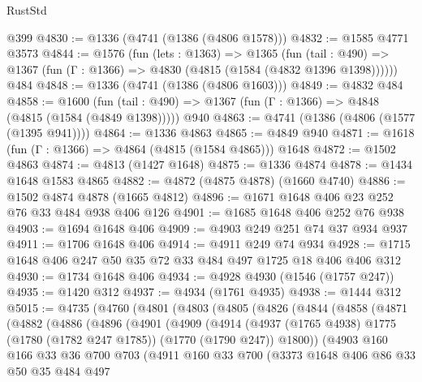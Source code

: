 \begin{lexlean}{RustStd}
\begin{coremodule}
    @399
@4830 := @1336 (@4741 (@1386 (@4806 @1578)))
@4832 := @1585 @4771 @3573
@4844 := @1576
    (fun (lets : @1363) =>
    @1365
      (fun (tail : @490) => @1367 (fun (Γ : @1366) => @4830 (@4815 (@1584 (@4832 @1396 @1398))))))
    @484
@4848 := @1336 (@4741 (@1386 (@4806 @1603)))
@4849 := @4832 @484
@4858 := @1600
    (fun (tail : @490) => @1367 (fun (Γ : @1366) => @4848 (@4815 (@1584 (@4849 @1398)))))
    @940
@4863 := @4741 (@1386 (@4806 (@1577 (@1395 @941))))
@4864 := @1336 @4863
@4865 := @4849 @940
@4871 := @1618 (fun (Γ : @1366) => @4864 (@4815 (@1584 @4865))) @1648
@4872 := @1502 @4863
@4874 := @4813 (@1427 @1648)
@4875 := @1336 @4874
@4878 := @1434 @1648 @1583 @4865
@4882 := @4872 (@4875 @4878) (@1660 @4740)
@4886 := @1502 @4874 @4878 (@1665 @4812)
@4896 := @1671 @1648 @406 @23 @252 @76 @33 @484 @938 @406 @126
@4901 := @1685 @1648 @406 @252 @76 @938
@4903 := @1694 @1648 @406
@4909 := @4903 @249 @251 @74 @37 @934 @937
@4911 := @1706 @1648 @406
@4914 := @4911 @249 @74 @934
@4928 := @1715 @1648 @406 @247 @50 @35 @72 @33 @484 @497 @1725 @18 @406 @406 @312
@4930 := @1734 @1648 @406
@4934 := @4928 @4930 (@1546 (@1757 @247))
@4935 := @1420 @312
@4937 := @4934 (@1761 @4935)
@4938 := @1444 @312
@5015 := @4735
    (@4760
      (@4801
        (@4803
          (@4805
            (@4826
              (@4844
                (@4858
                  (@4871
                    (@4882
                      (@4886
                        (@4896
                          (@4901
                            (@4909
                              (@4914
                                (@4937
                                  (@1765 @4938)
                                  @1775
                                  (@1780 (@1782 @247 @1785))
                                  (@1770 (@1790 @247))
                                  @1800))
                              (@4903
                                @160
                                @166
                                @33
                                @36
                                @700
                                @703
                                (@4911
                                  @160
                                  @33
                                  @700
                                  (@3373
                                    @1648
                                    @406
                                    @86
                                    @33
                                    @50
                                    @35
                                    @484
                                    @497

\end{coremodule}
\end{lexlean}

